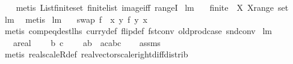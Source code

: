 \begin{isabellebody}
\ \ %
\endisadelimproof
%
\isatagproof
{}\isamarkupfalse%
\ {\isacharparenleft}metis\ List{\isachardot}finite{\isacharunderscore}set\ finite{\isacharunderscore}list\ image{\isacharunderscore}iff\ rangeI{\isacharparenright}%
\endisatagproof
{\isafoldproof}%
%
\isadelimproof
\isanewline
%
\endisadelimproof
\isanewline
\isanewline
{}\isamarkupfalse%
\ lm{}{}{}{\isacharcolon}\ \isanewline
\ \ {\isachardoublequoteopen}finite\ {\isacharequal}\ {\isacharparenleft}{\isacharpercent}X{\isachardot}\ X{\isasymin}range\ set{\isacharparenright}{\isachardoublequoteclose}\ \isanewline
%
\isadelimproof
\ \ %
\endisadelimproof
%
\isatagproof
{}\isamarkupfalse%
\ lm{}{}{}\ \isamarkupfalse%
\ metis%
\endisatagproof
{\isafoldproof}%
%
\isadelimproof
\isanewline
%
\endisadelimproof
\isanewline
{}\isamarkupfalse%
\ lm{}{}{}{\isacharcolon}\ \isanewline
\ \ {\isachardoublequoteopen}swap\ f\ {\isacharequal}\ {\isacharparenleft}{\isacharpercent}x{\isachardot}\ {\isacharpercent}y{\isachardot}\ f\ y\ x{\isacharparenright}{\isachardoublequoteclose}\ \isanewline
%
\isadelimproof
\ \ %
\endisadelimproof
%
\isatagproof
{}\isamarkupfalse%
\ {\isacharparenleft}metis\ comp{\isacharunderscore}eq{\isacharunderscore}dest{\isacharunderscore}lhs\ curry{\isacharunderscore}def\ flip{\isacharunderscore}def\ fst{\isacharunderscore}conv\ old{\isachardot}prod{\isachardot}case\ snd{\isacharunderscore}conv{\isacharparenright}%
\endisatagproof
{\isafoldproof}%
%
\isadelimproof
%
\endisadelimproof
%
\isamarkuptrue%
\isamarkupfalse%
\ lm{}{}{}{\isacharcolon}\ \isanewline
\ \ \ a{\isacharcolon}{\isacharcolon}real\ \isanewline
\ \ \ b\ c\ \isanewline
\ \ \ {\isachardoublequoteopen}a{\isacharasterisk}b\ {\isacharminus}\ a{\isacharasterisk}c{\isacharequal}a{\isacharasterisk}{\isacharparenleft}b{\isacharminus}c{\isacharparenright}{\isachardoublequoteclose}\isanewline
%
\isadelimproof
\ \ %
\endisadelimproof
%
\isatagproof
{}\isamarkupfalse%
\ assms\ \isamarkupfalse%
\ {\isacharparenleft}metis\ real{\isacharunderscore}scaleR{\isacharunderscore}def\ real{\isacharunderscore}vector{\isachardot}scale{\isacharunderscore}right{\isacharunderscore}diff{\isacharunderscore}distrib{\isacharparenright}%
\endisatagproof
{\isafoldproof}%

\end{isabellebody}
